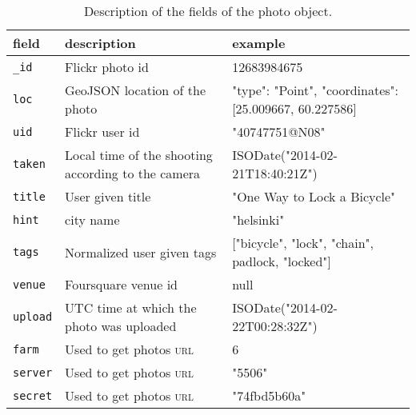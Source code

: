 \begin{table}[hb]
	\centering
	\begin{tabularx}{\textwidth}{lXX}
		\toprule
		field & description & example \\
		\midrule
		\texttt{\_id}   & Flickr photo id                                    & 12683984675 \\
		\texttt{loc}    & GeoJSON location of the photo                      & {"type": "Point", "coordinates": [25.009667, 60.227586]} \\
		\texttt{uid}    & Flickr user id                                     & "40747751@N08" \\
		\texttt{taken}  & Local time of the shooting according to the camera & ISODate("2014-02-21T18:40:21Z") \\
		\texttt{title}  & User given title                                   & "One Way to Lock a Bicycle" \\
		\texttt{hint}   & city name                                          & "helsinki" \\
		\texttt{tags}   & Normalized user given tags                         & ["bicycle", "lock", "chain", padlock, "locked"] \\
		\texttt{venue}  & Foursquare venue id                                & null \\
		\texttt{upload} & UTC time at which the photo was uploaded           & ISODate("2014-02-22T00:28:32Z") \\
		\texttt{farm}   & Used to get photos \textsc{url}          & 6 \\
		\texttt{server} & Used to get photos \textsc{url}          & "5506" \\
		\texttt{secret} & Used to get photos \textsc{url}          & "74fbd5b60a" \\
		\bottomrule
	\end{tabularx}
	\caption[Photo format]{Description of the fields of the photo
	object.\label{tab:photo}}
\end{table}

